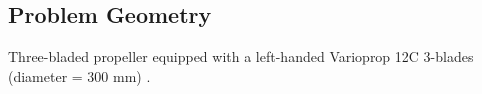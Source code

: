 \subsection{Problem Geometry}
\begin{frame}{\subsecname}
Three-bladed propeller equipped with a left-handed Varioprop 12C 3-blades (diameter = 300 mm) \cite{tesis}  \cite{paper}.
\begin{figure} [H]  
	\centering
  \quad
\end{figure}
\end{frame}
